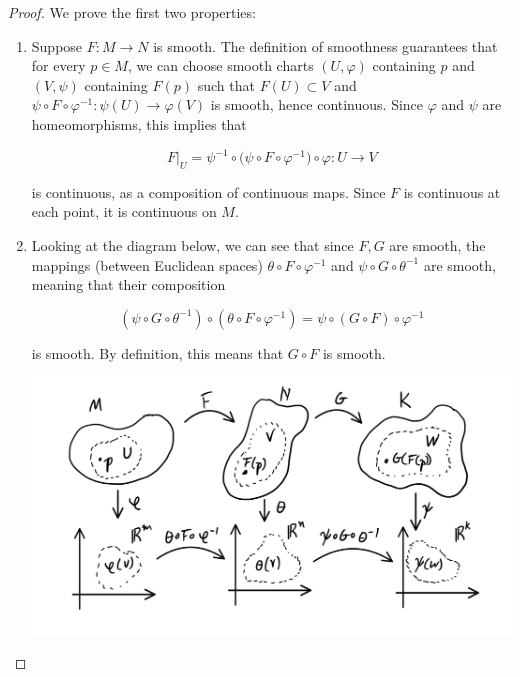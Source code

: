 \documentclass{article}
\theoremstyle{remark}
\theoremstyle{definition}
\begin{document}
  \begin{proof}
    We prove the first two properties: 
    \begin{enumerate}
      \item Suppose $F: M \longrightarrow N$ is smooth. The definition of smoothness guarantees that for every $p \in M$, we can choose smooth charts $(U, \varphi)$ containing $p$ and $(V, \psi)$ containing $F(p)$ such that $F(U) \subset V$ and $\psi \circ F \circ \varphi^{-1}: \psi(U) \longrightarrow \varphi(V)$ is smooth, hence continuous. Since $\varphi$ and $\psi$ are homeomorphisms, this implies that

      \[F \big|_U = \psi^{-1} \circ \big( \psi \circ F \circ \varphi^{-1} \big) \circ \varphi : U \longrightarrow V\]

      is continuous, as a composition of continuous maps. Since $F$ is continuous at each point, it is continuous on $M$.

      \item Looking at the diagram below, we can see that since $F, G$ are smooth, the mappings (between Euclidean spaces) $\theta \circ F \circ \varphi^{-1}$ and $\psi \circ G \circ \theta^{-1}$ are smooth, meaning that their composition

        \[(\psi \circ G \circ \theta^{-1}) \circ (\theta \circ F \circ \varphi^{-1}) = \psi \circ (G \circ F) \circ \varphi^{-1}\]

      is smooth. By definition, this means that $G \circ F$ is smooth. 

      \begin{center}
        \includegraphics[scale=0.25]{img/Composition_of_Smooth_Manifold_Mappings.PNG}
      \end{center}

    \end{enumerate}
  \end{proof}
\end{document}
